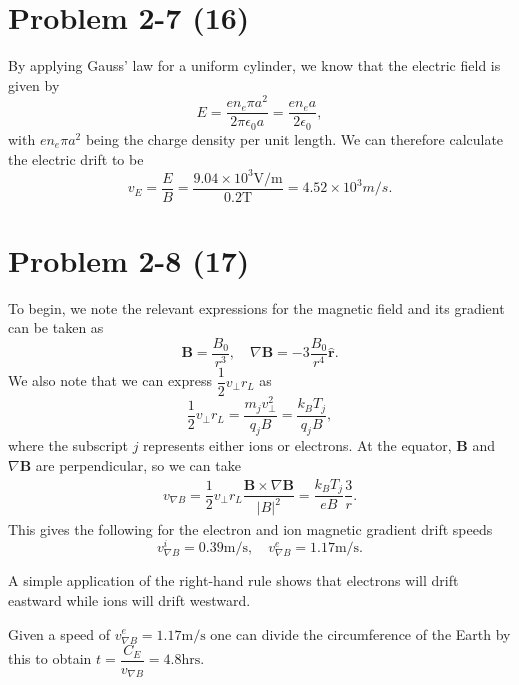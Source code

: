 \section*{Problem 2-7 (16)}
\label{sec:2-7}
By applying Gauss' law for a uniform cylinder, we know that the electric field is given by
\begin{equation*}
	E = \dfrac{en_e\pi a^2}{2\pi \epsilon_0 a} = \dfrac{en_e a}{2 \epsilon_0},
\end{equation*}
with \(en_e\pi a^2\) being the charge density per unit length. We can therefore calculate the electric drift to be
\begin{equation*}
	v_E = \dfrac{E}{B} = \dfrac{9.04 \times 10^3 \text{V/m}}{0.2\text{T}} = 4.52 \times 10^3 m/s.
\end{equation*}

\section*{Problem 2-8 (17)}
\label{sec:2-8}
To begin, we note the relevant expressions for the magnetic field and its gradient can be taken as
\begin{equation*}
	\textbf{B} = \dfrac{B_0}{r^3}, \quad \nabla\textbf{B} = -3\dfrac{B_0}{r^4}\hat{\textbf{r}}.
\end{equation*}
We also note that we can express \(\dfrac{1}{2} v_\perp r_L \) as
\begin{equation*}
\dfrac{1}{2} v_\perp r_L = \dfrac{m_jv_\perp^2}{q_jB} = \dfrac{k_BT_j}{q_jB},
\end{equation*}
where the subscript \(j\) represents either ions or electrons. At the equator, \(\textbf{B}\) and \(\nabla\textbf{B} \) are perpendicular, so we can take
\begin{align*}
	v_{\nabla B} = \dfrac{1}{2} v_\perp r_L \dfrac{\textbf{B} \times \nabla \textbf{B}}{|B|^2} = \dfrac{k_BT_j}{eB}\dfrac{3}{r}.
\end{align*}
This gives the following for the electron and ion magnetic gradient drift speeds
\begin{equation*}
	v_{\nabla B}^i = 0.39\text{m/s}, \quad v_{\nabla B}^e = 1.17\text{m/s}.
\end{equation*}

A simple application of the right-hand rule shows that electrons will drift eastward while ions will drift westward. 

Given a speed of \(v_{\nabla B}^e = 1.17\text{m/s} \) one can divide the circumference of the Earth by this to obtain \(t = \dfrac{C_E}{v_{\nabla B}} = 4.8\text{hrs}\).

